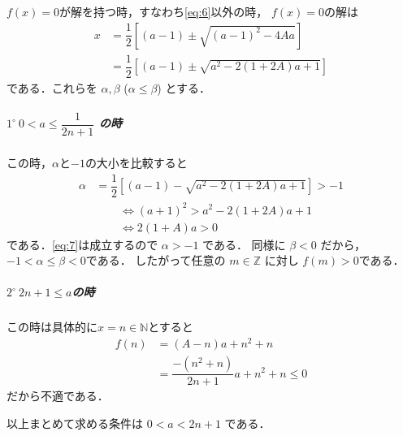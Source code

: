 \documentclass[../../main.tex]{subfiles}
\begin{document}
$f(x)=0$が解を持つ時，すなわち\cref{eq:6}以外の時，
$f(x)=0$の解は
\begin{align}
  x
  &= \dfrac{1}{2}\left[ (a-1) \pm \sqrt{(a-1)^2 - 4Aa} \right] \\
  &= \dfrac{1}{2}\left[ (a-1) \pm \sqrt{a^2 - 2(1+2A)a + 1} \right]
\end{align}
である．これらを $\alpha, \beta$ ($\alpha \le \beta$) とする．

\subparagraph{$1^\circ \ 0 < a \le \dfrac{1}{2n+1}$ の時}

この時，$\alpha$と$-1$の大小を比較すると
\begin{align}
  \alpha &= \dfrac{1}{2}\left[ (a-1) - \sqrt{a^2-2(1+2A)a+1} \right] > -1
\end{align}
\begin{align}
  &\iff (a+1)^2 > a^2 - 2(1+2A)a + 1 \\
  &\iff 2(1+A)a > 0 \label{eq:7}
\end{align}
である．\cref{eq:7}は成立するので $\alpha > -1$ である．
同様に $\beta < 0$ だから， $-1 < \alpha \le \beta < 0$である．
したがって任意の $m \in \mathbb{Z}$ に対し $f(m) > 0$である．

\subparagraph{$2^\circ \ 2n+1 \le a$の時}

この時は具体的に$x=n \in \mathbb{N}$とすると
\begin{align}
  f(n) &= (A-n)a + n^2 + n \\
  &= \dfrac{-(n^2+n)}{2n+1} a + n^2 + n \le 0
\end{align}
だから不適である．
\casesend

以上まとめて求める条件は $0 < a < 2n+1$ である．

\newpage
\end{document}
